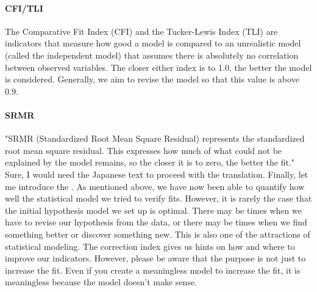 \documentclass{ltjsbook}
\begin{document}
\paragraph{CFI/TLI}
The Comparative Fit Index (CFI) and the Tucker-Lewis Index (TLI) are indicators that measure how good a model is compared to an unrealistic model (called the independent model) that assumes there is absolutely no correlation between observed variables. The closer either index is to 1.0, the better the model is considered. Generally, we aim to revise the model so that this value is above 0.9.
\paragraph{SRMR}
"SRMR (Standardized Root Mean Square Residual) represents the standardized root mean square residual. This expresses how much of what could not be explained by the model remains, so the closer it is to zero, the better the fit."
Sure, I would need the Japanese text to proceed with the translation.
Finally, let me introduce the .
As mentioned above, we have now been able to quantify how well the statistical model we tried to verify fits. However, it is rarely the case that the initial hypothesis model we set up is optimal. There may be times when we have to revise our hypothesis from the data, or there may be times when we find something better or discover something new. This is also one of the attractions of statistical modeling. The correction index gives us hints on how and where to improve our indicators. However, please be aware that the purpose is not just to increase the fit. Even if you create a meaningless model to increase the fit, it is meaningless because the model doesn't make sense.
\end{document}
